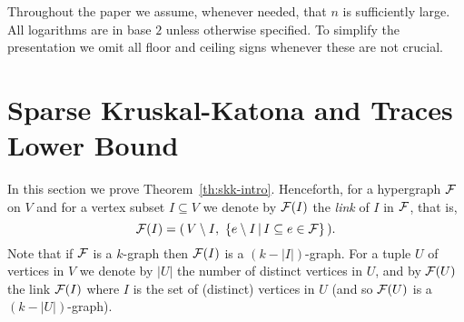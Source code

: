 \documentclass[11pt]{article}
\newcommand{\FF}{{\cal F}}
\newcommand{\sub}{\subseteq}
\begin{document}


\noindent
Throughout the paper we 
assume, whenever needed, that $n$ is sufficiently large. 
All logarithms are in base $2$ unless otherwise specified. 
To simplify the presentation we omit all floor and ceiling signs whenever these are not crucial. 

%


\section{Sparse Kruskal-Katona and Traces Lower Bound}\label{sec:sKK-LB}

In this section we prove Theorem~\ref{th:skk-intro}.
Henceforth, for a hypergraph $\FF$ on $V$ and for a vertex subset $I \sub V$ we denote by $\FF(I)$ the \emph{link} of $I$ in $\FF$, that is, 
$$\FF(I)=(\,V \setminus I,\,\,\{e \setminus I \,\vert\, I \sub e \in \FF \}\,).$$
Note that if $\FF$ is a $k$-graph then $\FF(I)$ is
a $(k-|I|)$-graph.
For a tuple $U$ of vertices in $V$ we denote by $|U|$ the number of 
distinct vertices in $U$, and by $\FF(U)$ the link $\FF(I)$ where 
$I$ is the set of (distinct) vertices in $U$ (and so $\FF(U)$ is a $(k-|U|)$-graph).
\end{document}
